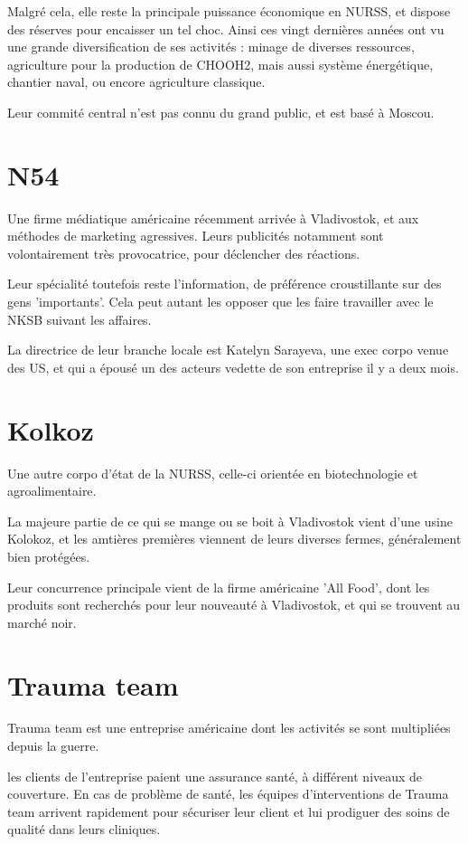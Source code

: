\documentclass[10pt,a4paper]{book}
\begin{document}
Malgré cela, elle reste la principale puissance économique en NURSS, et dispose des réserves pour encaisser un tel choc. Ainsi ces vingt dernières années ont vu une grande diversification de ses activités : minage de diverses ressources, agriculture pour la production de CHOOH2, mais aussi système énergétique, chantier naval, ou encore agriculture classique.

Leur commité central n'est pas connu du grand public, et est basé à Moscou.
\section{N54}
Une firme médiatique américaine récemment arrivée à Vladivostok, et aux méthodes de marketing agressives. Leurs publicités notamment sont volontairement très provocatrice, pour déclencher des réactions.

Leur spécialité toutefois reste l'information, de préférence croustillante sur des gens 'importants'. Cela peut autant les opposer que les faire travailler avec le NKSB suivant les affaires.

La directrice de leur branche locale est Katelyn Sarayeva, une exec corpo venue des US, et qui a épousé un des acteurs vedette de son entreprise il y a deux mois.
\section{Kolkoz}
Une autre corpo d'état de la NURSS, celle-ci orientée en biotechnologie et agroalimentaire.

La majeure partie de ce qui se mange ou se boit à Vladivostok vient d'une usine Kolokoz, et les amtières premières viennent de leurs diverses fermes, généralement bien protégées.

Leur concurrence principale vient de la firme américaine 'All Food', dont les produits sont recherchés pour leur nouveauté à Vladivostok, et qui se trouvent au marché noir.
\section{Trauma team}
Trauma team est une entreprise américaine dont les activités se sont multipliées depuis la guerre.

les clients de l'entreprise paient une assurance santé, à différent niveaux de couverture. En cas de problème de santé, les équipes d'interventions de Trauma team arrivent rapidement pour sécuriser leur client et lui prodiguer des soins de qualité dans leurs cliniques.
\end{document}
